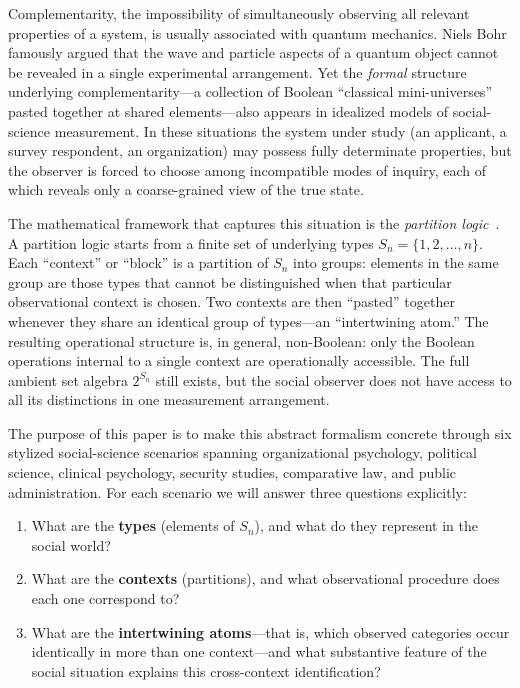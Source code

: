 \documentclass[aps,pra,twocolumn,superscriptaddress,floatfix,longbibliography]{revtex4-2}
\begin{document}
Complementarity, the impossibility of simultaneously observing all
relevant properties of a system, is usually associated with quantum
mechanics. Niels Bohr famously argued that the wave and particle
aspects of a quantum object cannot be revealed in a single
experimental arrangement. Yet the \emph{formal} structure underlying
complementarity---a collection of Boolean ``classical mini-universes''
pasted together at shared elements---also appears in idealized
models of social-science measurement. In these situations the system
under study (an applicant, a survey respondent, an organization)
may possess fully determinate properties, but the observer is forced
to choose among incompatible modes of inquiry, each of which reveals
only a coarse-grained view of the true state.

The mathematical framework that captures this situation is the
\emph{partition logic}~\cite{svozil-93,schaller-92,
dvur-pul-svo,svozil-2001-eua}. A partition logic starts from a
finite set of underlying types $S_n = \{1,2,\ldots,n\}$.
Each ``context'' or ``block'' is a partition of $S_n$ into groups:
elements in the same group are those types that cannot be
distinguished when that particular observational context is chosen.
Two contexts are then ``pasted'' together whenever they share an
identical group of types---an ``intertwining atom.'' The resulting
operational structure is, in general, non-Boolean: only the
Boolean operations internal to a single context are operationally
accessible. The full ambient set algebra $2^{S_n}$ still exists, but
the social observer does not have access to all its distinctions in
one measurement arrangement.

The purpose of this paper is to make this abstract formalism concrete
through six stylized social-science scenarios spanning organizational
psychology, political science, clinical psychology, security studies,
comparative law, and public administration. For each scenario we will
answer three questions explicitly:
\begin{enumerate}
\item What are the \textbf{types} (elements of $S_n$), and
what do they represent in the social world?
\item What are the \textbf{contexts} (partitions), and what
observational procedure does each one correspond to?
\item What are the \textbf{intertwining atoms}---that is, which
observed categories occur identically in more than one context---and
what substantive feature of the social situation explains this
cross-context identification?
\end{enumerate}
\end{document}
